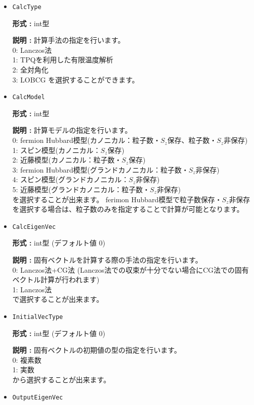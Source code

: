 \begin{itemize}
\item  \verb|CalcType|

{\bf 形式 :} int型 

{\bf 説明 :} 計算手法の指定を行います。\\
0: Lanczos法\\
1: TPQを利用した有限温度解析\\
2: 全対角化\\
3: LOBCG
を選択することができます。

\item  \verb|CalcModel|

{\bf 形式 :} int型 

{\bf 説明 :} 計算モデルの指定を行います。\\
0: fermion Hubbard模型(カノニカル：粒子数・$S_z$保存、{粒子数・$S_z$非保存})\\
1: スピン模型(カノニカル：$S_z$保存)\\
2: 近藤模型(カノニカル：粒子数・$S_z$保存)\\
3: fermion Hubbard模型(グランドカノニカル：粒子数・$S_z$非保存)\\
4: スピン模型(グランドカノニカル：$S_z$非保存)\\
5: 近藤模型(グランドカノニカル：粒子数・$S_z$非保存)\\
を選択することが出来ます。
{ferimon Hubbard模型で粒子数保存・$S_z$非保存を選択する場合は、粒子数のみを指定することで計算が可能となります。}

\item  \verb|CalcEigenVec|

{\bf 形式 :} int型 (デフォルト値 0)

{\bf 説明 :} 固有ベクトルを計算する際の手法の指定を行います。\\
0: Lanczos法+CG法 (Lanczos法での収束が十分でない場合にCG法での固有ベクトル計算が行われます)\\
1: Lanczos法\\
で選択することが出来ます。

\item  \verb|InitialVecType|

{\bf 形式 :} int型 (デフォルト値 0)

{\bf 説明 :} 固有ベクトルの初期値の型の指定を行います。\\
0: 複素数\\
1: 実数\\
から選択することが出来ます。

\item  \verb|OutputEigenVec|


\end{itemize}

